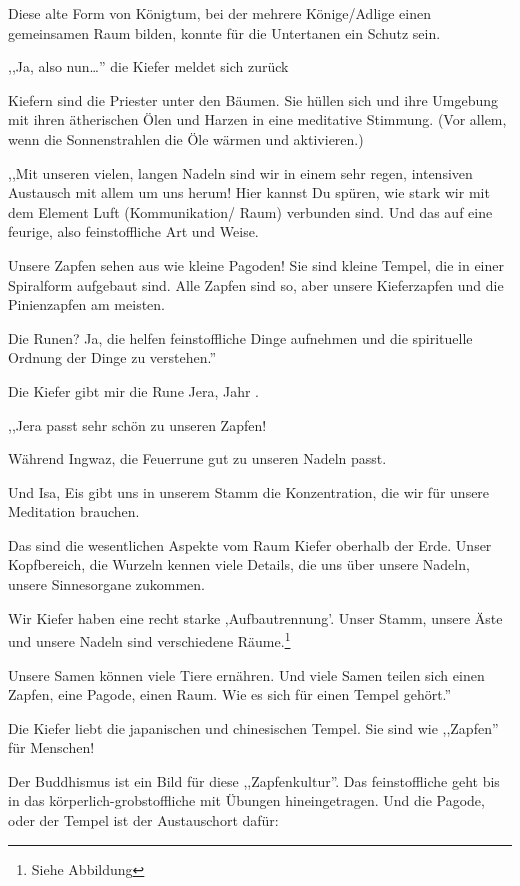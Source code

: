 \documentclass[11pt,titlepage,a5paper]{book}
\begin{document}
Diese alte Form von Königtum, bei der mehrere Könige/Adlige einen gemeinsamen Raum bilden, konnte für die Untertanen ein Schutz sein. 

,,Ja, also nun\dots '' die Kiefer meldet sich zurück

Kiefern sind die Priester unter den Bäumen. Sie hüllen sich und ihre Umgebung mit ihren ätherischen Ölen und Harzen in eine meditative Stimmung. (Vor allem, wenn die Sonnenstrahlen die Öle wärmen und aktivieren.) 

,,Mit unseren vielen, langen Nadeln sind wir in einem sehr regen, intensiven Austausch mit allem um uns herum! Hier kannst Du spüren, wie stark wir mit dem Element Luft (Kommunikation/ Raum) verbunden sind. Und das auf eine feurige, also feinstoffliche Art und Weise.

Unsere Zapfen sehen aus wie kleine Pagoden! Sie sind kleine Tempel, die in einer Spiralform aufgebaut sind. Alle Zapfen sind so, aber unsere Kieferzapfen und die Pinienzapfen am meisten.

Die Runen? Ja, die helfen feinstoffliche Dinge aufnehmen und die spirituelle Ordnung der Dinge zu verstehen.''

Die Kiefer gibt mir die Rune Jera, Jahr .

,,Jera  passt sehr schön zu unseren Zapfen!

Während Ingwaz, die Feuerrune  \textarc{[\withlines]\ng} gut zu unseren Nadeln passt. 

Und Isa, Eis  gibt uns in unserem Stamm die Konzentration, die wir für unsere Meditation brauchen.

Das sind die wesentlichen Aspekte vom Raum Kiefer oberhalb der Erde. Unser Kopfbereich, die Wurzeln kennen viele Details, die uns über unsere Nadeln, unsere Sinnesorgane zukommen.

Wir Kiefer haben eine recht starke ,Aufbautrennung'. Unser Stamm, unsere Äste und unsere Nadeln sind verschiedene Räume.\footnote{Siehe Abbildung}

Unsere Samen können viele Tiere ernähren. Und viele Samen teilen sich einen Zapfen, eine Pagode, einen Raum. Wie es sich für einen Tempel gehört.''

Die Kiefer liebt die japanischen und chinesischen Tempel. Sie sind wie ,,Zapfen'' für Menschen!

Der Buddhismus ist ein Bild für diese ,,Zapfenkultur''. Das feinstoffliche geht bis in das körperlich-grobstoffliche mit Übungen hineingetragen. Und die Pagode, oder der Tempel ist der Austauschort dafür:
\end{document}
